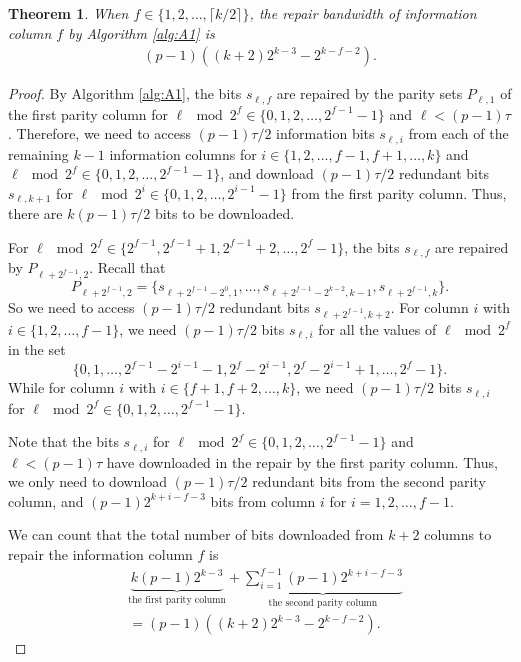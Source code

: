 \documentclass[conference]{IEEEtran}
\newtheorem{theorem}{Theorem}
\begin{document}
\begin{theorem}
When $f\in\{1, 2,\ldots, \lceil k/2 \rceil\}$, the repair bandwidth of information column $f$ by Algorithm \ref{alg:A1} is
\begin{align*}
(p-1)((k+2)2^{k-3}-2^{k-f-2}).
\end{align*}
\label{thmrep}
\end{theorem}
\begin{proof}
By Algorithm \ref{alg:A1}, the bits $s_{\ell,f}$ are repaired by the parity sets $P_{\ell,1}$ of the first parity column for $\ell \mod 2^f \in \{0,1,2,\ldots,2^{f-1}-1\}$ and $\ell < (p-1)\tau$. Therefore, we need to access $(p-1)\tau/2$ information bits $s_{\ell,i}$ from each of the remaining $k-1$ information columns for $i\in\{1,2,\ldots,f-1,f+1,\ldots,k\}$ and $\ell \mod 2^f \in \{0,1,2,\ldots,2^{f-1}-1\}$, and download $(p-1)\tau/2$ redundant bits $s_{\ell,k+1}$ for $\ell \mod 2^i \in \{0,1,2,\ldots,2^{i-1}-1\}$ from the first parity column. Thus, there are $k(p-1)\tau/2$
bits to be downloaded.

For $\ell \mod 2^f \in \{2^{f-1},2^{f-1}+1,2^{f-1}+2,\ldots,2^{f}-1\}$, the bits $s_{\ell,f}$ are repaired by $P_{\ell+2^{f-1},2}$. Recall that
$$P_{\ell+2^{f-1},2}=\{s_{\ell+2^{f-1}-2^{0},1},\ldots,s_{\ell+2^{f-1}-2^{k-2},k-1},s_{\ell+2^{f-1},k}\}.$$
So we need to access $(p-1)\tau/2$ redundant bits $s_{\ell+2^{f-1},k+2}$. For column $i$ with $i\in\{1,2,\ldots,f-1\}$, we need $(p-1)\tau/2$ bits $s_{\ell,i}$ for all the values of $\ell \mod 2^f$ in the set
$$\{0,1, \ldots, 2^{f-1}-2^{i-1}-1,2^{f}-2^{i-1},2^{f}-2^{i-1}+1,\ldots,2^{f}-1\}.$$
While for column $i$ with $i\in\{f+1,f+2,\ldots,k\}$, we need $(p-1)\tau/2$ bits $s_{\ell,i}$ for $\ell \mod 2^f \in \{0,1,2,\ldots,2^{f-1}-1\}$.

Note that the bits $s_{\ell,i}$ for $\ell \mod 2^f \in \{0,1,2,\ldots,2^{f-1}-1\}$ and $\ell < (p-1)\tau$ have downloaded in the repair by the first parity column. Thus, we only need to download $(p-1)\tau/2$ redundant bits from the second parity column, and
$(p-1)2^{k+i-f-3}$
bits from column $i$ for $i=1,2,\ldots,f-1$.

We can count that the total number of bits downloaded from $k+2$ columns to repair the information column $f$ is
\begin{align*}
&\underbrace{k(p-1)2^{k-3}}_{\text{the first parity column}}+\underbrace{\sum_{i=1}^{f-1}(p-1)2^{k+i-f-3}}_{\text{the second parity column}}\\
&=(p-1)((k+2)2^{k-3}-2^{k-f-2}).
\end{align*}
\end{proof}
\end{document}
